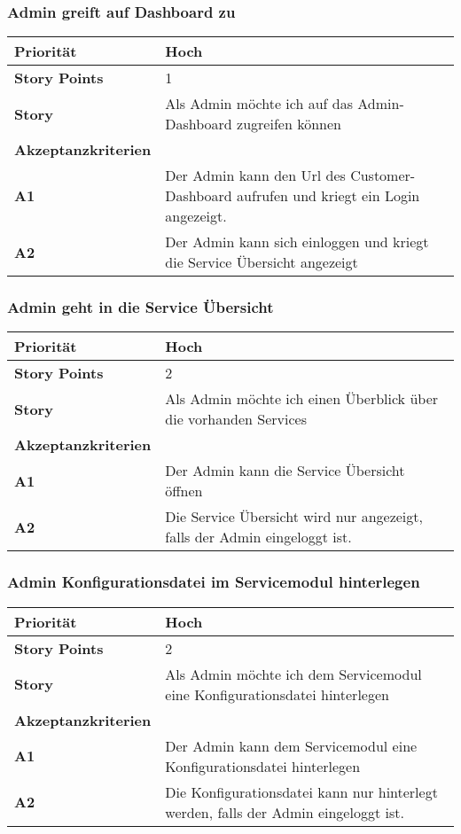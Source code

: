  \subsubsection{Admin greift auf Dashboard zu}
\begin{tabularx}{\linewidth}{l X}
  \textbf{Priorität} & Hoch\\
  \hline
  \textbf{Story Points} & 1\\
  \hline
  \textbf{Story}& Als Admin möchte ich auf das Admin-Dashboard zugreifen können\\
  \hline
    \textbf{Akzeptanzkriterien} & \\
    \hline
  \textbf{A1} & Der Admin kann den Url des Customer-Dashboard aufrufen und 
  kriegt ein Login angezeigt.\\
  \hline
  \textbf{A2} & Der Admin kann sich einloggen und kriegt die Service Übersicht angezeigt\\
  \hline
 \end{tabularx}
 
 \subsubsection{Admin geht in die Service Übersicht}
 
    \begin{tabularx}{\linewidth}{l X}
  \textbf{Priorität} & Hoch\\
  \hline
  \textbf{Story Points} & 2\\
  \hline
  \textbf{Story}& Als Admin möchte ich einen Überblick über die vorhanden Services\\
  \hline
    \textbf{Akzeptanzkriterien} & \\
    \hline
      \textbf{A1} & Der Admin kann die Service Übersicht öffnen\\
  \hline
    \textbf{A2} & Die Service Übersicht wird nur angezeigt, falls der Admin eingeloggt ist.\\
  \hline
 \end{tabularx}


 \subsubsection{Admin Konfigurationsdatei im Servicemodul hinterlegen}
     \begin{tabularx}{\linewidth}{l X}
  \textbf{Priorität} & Hoch\\
  \hline
  \textbf{Story Points} & 2\\
  \hline
  \textbf{Story}& Als Admin möchte ich dem Servicemodul eine Konfigurationsdatei hinterlegen\\
  \hline
    \textbf{Akzeptanzkriterien} & \\
    \hline
      \textbf{A1} & Der Admin kann dem Servicemodul eine Konfigurationsdatei hinterlegen\\
  \hline
    \textbf{A2} & Die Konfigurationsdatei kann nur hinterlegt werden, falls der Admin eingeloggt ist.\\
  \hline
 \end{tabularx}